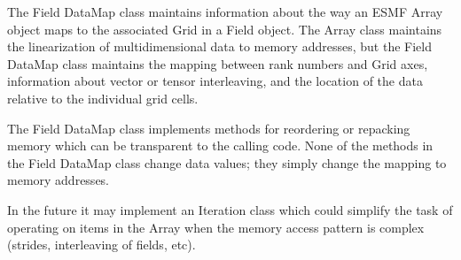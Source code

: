 

The Field DataMap class maintains information about the way an ESMF Array
object maps to the associated Grid in a Field object.  The Array class
maintains the linearization of multidimensional data to memory addresses,
but the Field DataMap class maintains the mapping between rank numbers and
Grid axes, information about vector or tensor interleaving, and the
location of the data relative to the individual grid cells.

The Field DataMap class implements methods for reordering or repacking
memory which can be transparent to the calling code.  None of the
methods in the Field DataMap class change data values; they simply
change the mapping to memory addresses.

In the future it may implement an Iteration class which could simplify
the task of operating on items in the Array when the memory
access pattern is complex (strides, interleaving of fields, etc).

